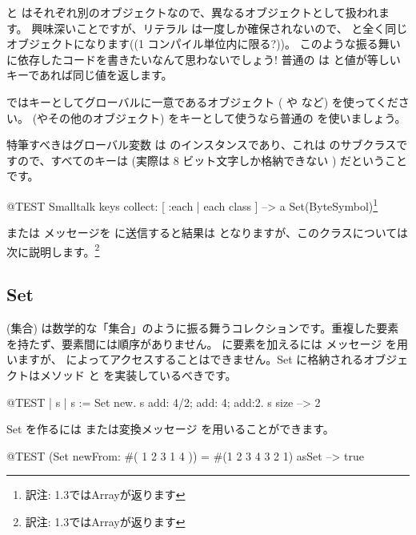 \documentclass[a4paper,10pt,twoside]{book}
\begin{document}
\noindent
{} と  はそれぞれ別のオブジェクトなので、異なるオブジェクトとして扱われます。
興味深いことですが、リテラル \mbox{} は一度しか確保されないので、 と全く同じオブジェクトになります((1 コンパイル単位内に限る?))。
このような振る舞いに依存したコードを書きたいなんて思わないでしょう!
普通の  は  と値が等しいキーであれば同じ値を返します。

 ではキーとしてグローバルに一意であるオブジェクト ( や  など) を使ってください。 (やその他のオブジェクト) をキーとして使うなら普通の  を使いましょう。


特筆すべきはグローバル変数  は  のインスタンスであり、これは  のサブクラスですので、すべてのキーは  (実際は 8 ビット文字しか格納できない ) だということです。

\begin{code}{@TEST}
Smalltalk keys collect: [ :each | each class ] --> a Set(ByteSymbol)\footnote{訳注: \pharo 1.3ではArrayが返ります}
\end{code}
\noindent
{} または  メッセージを  に送信すると結果は  となりますが、このクラスについては次に説明します。\footnote{訳注: \pharo 1.3ではArrayが返ります}

\subsection{Set}
 (集合) は数学的な「集合」のように振る舞うコレクションです。\ie 重複した要素を持たず、要素間には順序がありません。 に要素を加えるには  メッセージ を用いますが、 によってアクセスすることはできません。Set に格納されるオブジェクトはメソッド  と \ct{=} を実装しているべきです。

\begin{code}{@TEST | s | }
s := Set new.
s add: 4/2; add: 4; add:2.
s size --> 2
\end{code}

Set を作るには  または変換メッセージ  を用いることができます。

\begin{code}{@TEST}
(Set newFrom: #( 1 2 3 1 4 )) = #(1 2 3 4 3 2 1) asSet --> true
\end{code}
\end{document}
